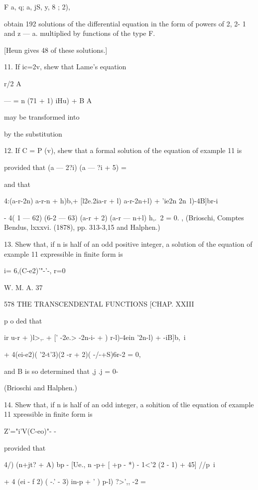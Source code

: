 {{{{{{{{F a, q; a, jS, y, 8 ; 2), 

obtain 192 solutions of the differential equation in the form of powers of 2, 2- 1 and z — a. 
multiplied by functions of the type F. 

[Heun gives 48 of these solutions.] 

11. If ic=2v, shew that Lame's equation 



r/2 A 

— =  n (71 + 1) iHu) + B  A 



may be transformed into 



by the substitution 

12. If C = P (v), shew that a formal solution of the equation of example 11 is 

provided that (a — 2?i) (a — ?i + 5) = 

and that 

4:(a-r-2n) a-r-n + h)b,+ [l2e.2ia-r + l) a-r-2n+l) + 'ie2n 2n~l)-4B]br-i 

- 4( 1 — 62) (6-2 — 63) (a-r + 2) (a-r — n+l) h,.\ 2 = 0. 
, (Brioschi, Comptes Bendus, lxxxvi. (1878), pp. 313-3,15 and Halphen.) 

13. Shew that, if n is half of an odd positive integer, a solution of the equation of 
example 11 expressible in finite form is 

i= 6,(C-e2)'"-'-, 
r=0 

W. M. A. 37 



578 THE TRANSCENDENTAL FUNCTIONS [CHAP. XXIII 

p o ded that 

 ir u-r +  )l>,. + [' -2e.> -2n-i- +  )  r-l)-4ein '2n-l) + -iB]b,\ i 

+ 4(ei-e2)( '2-t'3)(2 -r + 2)( -/-+S)6r-2 = 0, 

and B is so determined that  ,j .j  = 0- 

(Brioschi and Halphen.) 

14. Shew that, if n is half of an odd integer, a sohition of tlie equation of example 11 
xpressible in finite form is 

Z'="i'V(C-eo)"- -  

provided that 

4/) (n+jt? + A) bp - [Ue.,  n -p+  [  +p - *) -  1<'2  (2  - 1) + 45] //p\ i 

+ 4 (ei - f 2) ( -.' -  3) in-p + ' ) p-l) ?>',, -2 = 

}}}}}}}}
